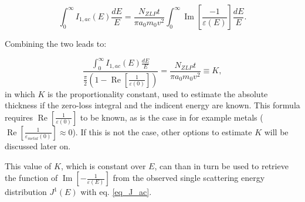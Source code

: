\begin{equation}\label{eq_J_ac}
    \int_{0}^{\infty} I_{1,ac}(E) \frac{d E}{E}=  \frac{N_{ZLP} t}{\pi a_{0} m_{0} v^{2}}  \int_{0}^{\infty} \operatorname{Im}\left[\frac{-1}{\varepsilon(E)}\right]   \frac{d E}{E} .
\end{equation}

Combining the two leads to:

\begin{equation}
    \frac{\int_{0}^{\infty} I_{1,ac}(E) \frac{d E}{E}}{\frac{\pi}{2}(1-\operatorname{Re}\left[\frac{1}{\varepsilon(0)}\right])} = \frac{N_{ZLP} t}{\pi a_{0} m_{0} v^{2}} \equiv K ,
\end{equation}
in which $K$ is the proportionality constant, used to estimate the absolute thickness if the zero-loss integral and the indicent energy are known. This formula requires $\operatorname{Re}\left[\frac{1}{\varepsilon(0)}\right]$ to be known, as is the case in for example metals ($\operatorname{Re}\left[\frac{1}{\varepsilon_{metal}(0)}\right]\approx 0$). If this is not the case, other options to estimate $K$ will be discussed later on.

This value of $K$, which is constant over $E$, can than in turn be used to retrieve the function of $\operatorname{Im}\left[-\frac{1}{\varepsilon(E)}\right]$ from the observed single scattering energy distribution $J^1(E)$ with eq. \eqref{eq_J_ac}.


